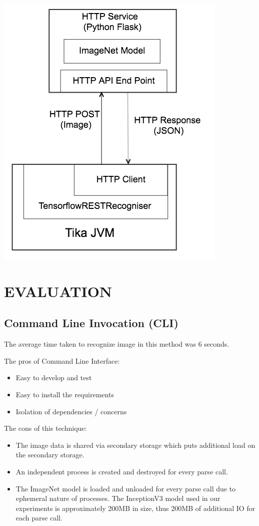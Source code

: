 \documentclass[letterpaper, 10 pt, conference]{ieeeconf}  %
\begin{document}
\includegraphics[scale=0.40]{tika-tflow-rest-design}


\section {EVALUATION} \label{sec:evaluation}
\subsection{Command Line Invocation (CLI)} \label{sec:eval-cli}
The average time taken to recognize image in this method was 6 seconds.

The pros of Command Line Interface:
\begin{itemize}
\item Easy to develop and test
\item Easy to install the requirements
\item Isolation of dependencies / concerns
\end{itemize}

The cons of this technique:
\begin{itemize}
\item The image data is shared via secondary storage which puts additional load on the  secondary storage.
\item An independent process is created and destroyed for every parse call.
\item The ImageNet model is loaded and unloaded for every parse call due to ephemeral nature of processes. The InceptionV3 model used in our experiments is approximately 200MB in size, thus 200MB of additional IO for each parse call.
\end{itemize}
\end{document}
